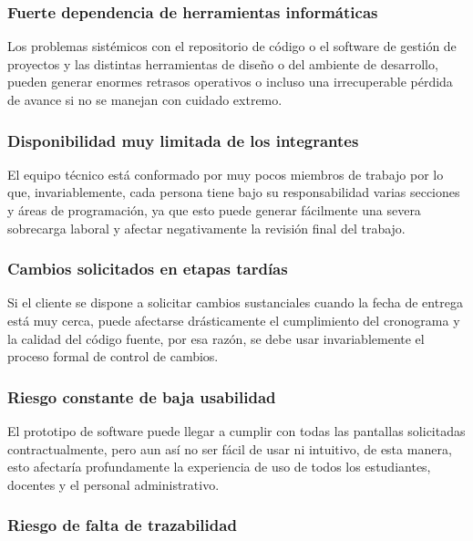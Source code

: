 \documentclass[11pt,spanish]{article}
\begin{document}
\subsubsection{Fuerte dependencia de herramientas informáticas}

Los problemas sistémicos con el repositorio de código o el software de gestión de proyectos y las distintas herramientas de diseño o del ambiente de desarrollo, pueden generar enormes retrasos operativos o incluso una irrecuperable pérdida de avance si no se manejan con cuidado extremo.

\subsubsection{Disponibilidad muy limitada de los integrantes}

El equipo técnico está conformado por muy pocos miembros de trabajo por lo que, invariablemente, cada persona tiene bajo su responsabilidad varias secciones y áreas de programación, ya que esto puede generar fácilmente una severa sobrecarga laboral y afectar negativamente la revisión final del trabajo.

\subsubsection{Cambios solicitados en etapas tardías}

Si el cliente se dispone a solicitar cambios sustanciales cuando la fecha de entrega está muy cerca, puede afectarse drásticamente el cumplimiento del cronograma y la calidad del código fuente, por esa razón, se debe usar invariablemente el proceso formal de control de cambios.

\subsubsection{Riesgo constante de baja usabilidad}

El prototipo de software puede llegar a cumplir con todas las pantallas solicitadas contractualmente, pero aun así no ser fácil de usar ni intuitivo, de esta manera, esto afectaría profundamente la experiencia de uso de todos los estudiantes, docentes y el personal administrativo.

\subsubsection{Riesgo de falta de trazabilidad}
\end{document}
